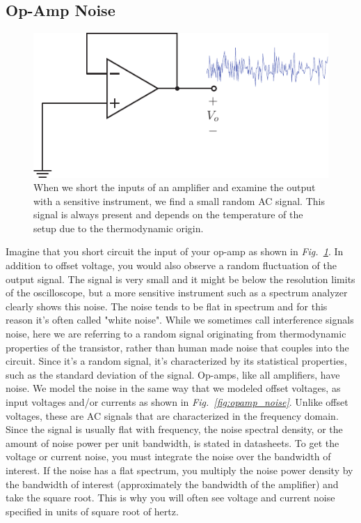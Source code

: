 \subsection{Op-Amp Noise}
\begin{figure}[tb]
\centering
\includegraphics[scale=1]{opamp_unitygain_noise}
\caption{When we short the inputs of an amplifier and examine the output with a sensitive instrument, we find a small random AC signal.  This signal is always present and depends on the temperature of the setup due to the thermodynamic origin.}
\label{fig:opamp_unitygain_noise_fig}
\end{figure}
Imagine that you short circuit the input of your op-amp as shown in \emph{Fig.~\ref{fig:opamp_unitygain_noise_fig}}. In addition to offset voltage, you would also observe a random fluctuation of the output signal.  The signal is very small and it might be below the resolution limits of the oscilloscope, but a more sensitive instrument such as a spectrum analyzer clearly shows this noise.  The noise tends to be flat in spectrum and for this reason it's often called "white noise".  While we sometimes call interference signals noise, here we are referring to a random signal originating from thermodynamic properties of the transistor, rather than human made noise that couples into the circuit.   Since it's a random signal, it's characterized by its statistical properties, such as the standard deviation of the signal.  
Op-amps, like all amplifiers, have noise.  We model the noise in the same way that we modeled offset voltages, as input voltages and/or currents as shown in \emph{Fig.~\ref{fig:opamp_noise}}.  Unlike offset voltages, these are AC signals that are characterized in the frequency domain.  Since the signal is usually flat with frequency, the noise spectral density, or the amount of noise power per unit bandwidth, is stated in datasheets.  To get the voltage or current noise, you must integrate the noise over the bandwidth of interest.  If the noise has a flat spectrum, you multiply the noise power density by the bandwidth of interest (approximately the bandwidth of the amplifier) and take the square root.  This is why you will often see voltage and current noise specified in units of square root of hertz.
